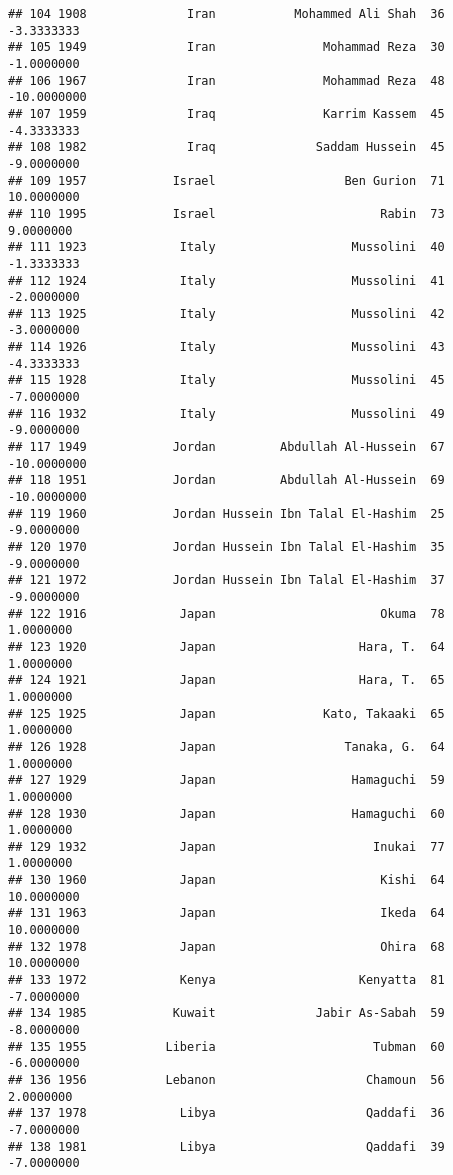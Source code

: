 \documentclass[
]{article}
\begin{document}
\begin{verbatim}
## 104 1908              Iran           Mohammed Ali Shah  36   -3.3333333
## 105 1949              Iran               Mohammad Reza  30   -1.0000000
## 106 1967              Iran               Mohammad Reza  48  -10.0000000
## 107 1959              Iraq               Karrim Kassem  45   -4.3333333
## 108 1982              Iraq              Saddam Hussein  45   -9.0000000
## 109 1957            Israel                  Ben Gurion  71   10.0000000
## 110 1995            Israel                       Rabin  73    9.0000000
## 111 1923             Italy                   Mussolini  40   -1.3333333
## 112 1924             Italy                   Mussolini  41   -2.0000000
## 113 1925             Italy                   Mussolini  42   -3.0000000
## 114 1926             Italy                   Mussolini  43   -4.3333333
## 115 1928             Italy                   Mussolini  45   -7.0000000
## 116 1932             Italy                   Mussolini  49   -9.0000000
## 117 1949            Jordan         Abdullah Al-Hussein  67  -10.0000000
## 118 1951            Jordan         Abdullah Al-Hussein  69  -10.0000000
## 119 1960            Jordan Hussein Ibn Talal El-Hashim  25   -9.0000000
## 120 1970            Jordan Hussein Ibn Talal El-Hashim  35   -9.0000000
## 121 1972            Jordan Hussein Ibn Talal El-Hashim  37   -9.0000000
## 122 1916             Japan                       Okuma  78    1.0000000
## 123 1920             Japan                    Hara, T.  64    1.0000000
## 124 1921             Japan                    Hara, T.  65    1.0000000
## 125 1925             Japan               Kato, Takaaki  65    1.0000000
## 126 1928             Japan                  Tanaka, G.  64    1.0000000
## 127 1929             Japan                   Hamaguchi  59    1.0000000
## 128 1930             Japan                   Hamaguchi  60    1.0000000
## 129 1932             Japan                      Inukai  77    1.0000000
## 130 1960             Japan                       Kishi  64   10.0000000
## 131 1963             Japan                       Ikeda  64   10.0000000
## 132 1978             Japan                       Ohira  68   10.0000000
## 133 1972             Kenya                    Kenyatta  81   -7.0000000
## 134 1985            Kuwait              Jabir As-Sabah  59   -8.0000000
## 135 1955           Liberia                      Tubman  60   -6.0000000
## 136 1956           Lebanon                     Chamoun  56    2.0000000
## 137 1978             Libya                     Qaddafi  36   -7.0000000
## 138 1981             Libya                     Qaddafi  39   -7.0000000

\end{verbatim}
\end{document}
